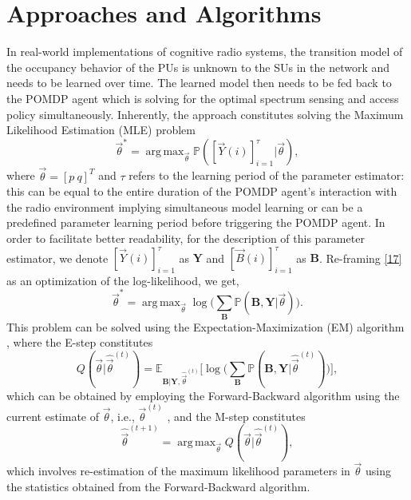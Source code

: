 \documentclass[10pt,twocolumn]{IEEEtran}
\DeclareMathOperator*{\argmax}{arg\,max}
\begin{document}
\section{Approaches and Algorithms}\label{III}
In real-world implementations of cognitive radio systems, the transition model of the occupancy behavior of the PUs is unknown to the SUs in the network and needs to be learned over time. The learned model then needs to be fed back to the POMDP agent which is solving for the optimal spectrum sensing and access policy simultaneously. Inherently, the approach constitutes solving the Maximum Likelihood Estimation (MLE) problem
\begin{equation}\label{17}
    \vec{\theta}^{*} = \argmax_{\vec{\theta}} \mathbb{P}([\vec{Y}(i)]_{i=1}^{\tau}|\vec{\theta}),
\end{equation}
where $\vec{\theta}{=}[p\ q]^{T}$ and $\tau$ refers to the learning period of the parameter estimator: this can be equal to the entire duration of the POMDP agent's interaction with the radio environment implying simultaneous model learning or can be a predefined parameter learning period before triggering the POMDP agent. In order to facilitate better readability, for the description of this parameter estimator, we denote $[\vec{Y}(i)]_{i=1}^{\tau}$ as $\mathbf{Y}$ and $[\vec{B}(i)]_{i=1}^{\tau}$ as $\mathbf{B}$. Re-framing \eqref{17} as an optimization of the log-likelihood, we get,
\begin{equation}\label{18}
    \vec{\theta}^{*} = \argmax_{\vec{\theta}} \log\Big(\sum_{\mathbf{B}} \mathbb{P}(\mathbf{B}, \mathbf{Y}| \vec{\theta})\Big).
\end{equation}
This problem can be solved using the Expectation-Maximization (EM) algorithm \cite{778361}, where the E-step constitutes
\begin{equation}
    Q(\vec{\theta}|\hat{\vec{\theta}}^{(t)}) = \mathbb{E}_{\mathbf{B}|\mathbf{Y}, \hat{\vec{\theta}}^{(t)}} \Big[ \log \Big(\sum_{\mathbf{B}} \mathbb{P}(\mathbf{B}, \mathbf{Y}|\hat{\vec{\theta}}^{(t)}) \Big) \Big],
\end{equation}
which can be obtained by employing the Forward-Backward algorithm using the current estimate of $\vec{\theta}$, i.e., $\vec{\theta}^{(t)}$ \cite{778361}, and the M-step constitutes
\begin{equation}
    \hat{\vec{\theta}}^{(t+1)} = \argmax_{\vec{\theta}} Q(\vec{\theta}|\hat{\vec{\theta}}^{(t)}),
\end{equation}
which involves re-estimation of the maximum likelihood parameters in $\vec{\theta}$ using the statistics obtained from the Forward-Backward algorithm.
\end{document}
